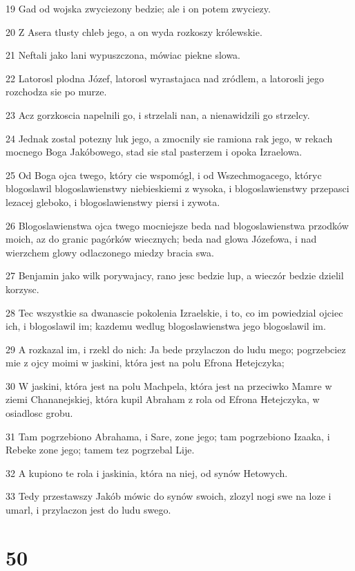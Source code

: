 \par 19 Gad od wojska zwyciezony bedzie; ale i on potem zwyciezy.
\par 20 Z Asera tlusty chleb jego, a on wyda rozkoszy królewskie.
\par 21 Neftali jako lani wypuszczona, mówiac piekne slowa.
\par 22 Latorosl plodna Józef, latorosl wyrastajaca nad zródlem, a latorosli jego rozchodza sie po murze.
\par 23 Acz gorzkoscia napelnili go, i strzelali nan, a nienawidzili go strzelcy.
\par 24 Jednak zostal potezny luk jego, a zmocnily sie ramiona rak jego, w rekach mocnego Boga Jakóbowego, stad sie stal pasterzem i opoka Izraelowa.
\par 25 Od Boga ojca twego, który cie wspomógl, i od Wszechmogacego, któryc blogoslawil blogoslawienstwy niebieskiemi z wysoka, i blogoslawienstwy przepasci lezacej gleboko, i blogoslawienstwy piersi i zywota.
\par 26 Blogoslawienstwa ojca twego mocniejsze beda nad blogoslawienstwa przodków moich, az do granic pagórków wiecznych; beda nad glowa Józefowa, i nad wierzchem glowy odlaczonego miedzy bracia swa.
\par 27 Benjamin jako wilk porywajacy, rano jesc bedzie lup, a wieczór bedzie dzielil korzysc.
\par 28 Tec wszystkie sa dwanascie pokolenia Izraelskie, i to, co im powiedzial ojciec ich, i blogoslawil im; kazdemu wedlug blogoslawienstwa jego blogoslawil im.
\par 29 A rozkazal im, i rzekl do nich: Ja bede przylaczon do ludu mego; pogrzebciez mie z ojcy moimi w jaskini, która jest na polu Efrona Hetejczyka;
\par 30 W jaskini, która jest na polu Machpela, która jest na przeciwko Mamre w ziemi Chananejskiej, która kupil Abraham z rola od Efrona Hetejczyka, w osiadlosc grobu.
\par 31 Tam pogrzebiono Abrahama, i Sare, zone jego; tam pogrzebiono Izaaka, i Rebeke zone jego; tamem tez pogrzebal Lije.
\par 32 A kupiono te rola i jaskinia, która na niej, od synów Hetowych.
\par 33 Tedy przestawszy Jakób mówic do synów swoich, zlozyl nogi swe na loze i umarl, i przylaczon jest do ludu swego.

\chapter{50}

